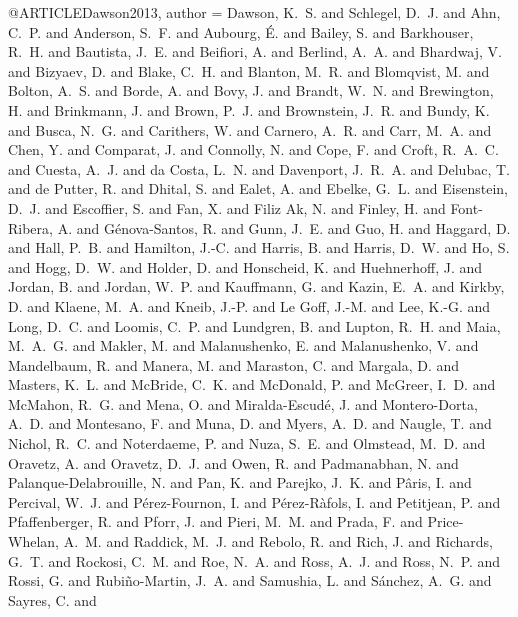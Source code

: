 \documentclass{aa}
\begin{document}
{{{{{{{{{{{{@ARTICLE{Dawson2013,
   author = {{Dawson}, K.~S. and {Schlegel}, D.~J. and {Ahn}, C.~P. and {Anderson}, S.~F. and 
	{Aubourg}, {\'E}. and {Bailey}, S. and {Barkhouser}, R.~H. and 
	{Bautista}, J.~E. and {Beifiori}, A. and {Berlind}, A.~A. and 
	{Bhardwaj}, V. and {Bizyaev}, D. and {Blake}, C.~H. and {Blanton}, M.~R. and 
	{Blomqvist}, M. and {Bolton}, A.~S. and {Borde}, A. and {Bovy}, J. and 
	{Brandt}, W.~N. and {Brewington}, H. and {Brinkmann}, J. and 
	{Brown}, P.~J. and {Brownstein}, J.~R. and {Bundy}, K. and {Busca}, N.~G. and 
	{Carithers}, W. and {Carnero}, A.~R. and {Carr}, M.~A. and {Chen}, Y. and 
	{Comparat}, J. and {Connolly}, N. and {Cope}, F. and {Croft}, R.~A.~C. and 
	{Cuesta}, A.~J. and {da Costa}, L.~N. and {Davenport}, J.~R.~A. and 
	{Delubac}, T. and {de Putter}, R. and {Dhital}, S. and {Ealet}, A. and 
	{Ebelke}, G.~L. and {Eisenstein}, D.~J. and {Escoffier}, S. and 
	{Fan}, X. and {Filiz Ak}, N. and {Finley}, H. and {Font-Ribera}, A. and 
	{G{\'e}nova-Santos}, R. and {Gunn}, J.~E. and {Guo}, H. and 
	{Haggard}, D. and {Hall}, P.~B. and {Hamilton}, J.-C. and {Harris}, B. and 
	{Harris}, D.~W. and {Ho}, S. and {Hogg}, D.~W. and {Holder}, D. and 
	{Honscheid}, K. and {Huehnerhoff}, J. and {Jordan}, B. and {Jordan}, W.~P. and 
	{Kauffmann}, G. and {Kazin}, E.~A. and {Kirkby}, D. and {Klaene}, M.~A. and 
	{Kneib}, J.-P. and {Le Goff}, J.-M. and {Lee}, K.-G. and {Long}, D.~C. and 
	{Loomis}, C.~P. and {Lundgren}, B. and {Lupton}, R.~H. and {Maia}, M.~A.~G. and 
	{Makler}, M. and {Malanushenko}, E. and {Malanushenko}, V. and 
	{Mandelbaum}, R. and {Manera}, M. and {Maraston}, C. and {Margala}, D. and 
	{Masters}, K.~L. and {McBride}, C.~K. and {McDonald}, P. and 
	{McGreer}, I.~D. and {McMahon}, R.~G. and {Mena}, O. and {Miralda-Escud{\'e}}, J. and 
	{Montero-Dorta}, A.~D. and {Montesano}, F. and {Muna}, D. and 
	{Myers}, A.~D. and {Naugle}, T. and {Nichol}, R.~C. and {Noterdaeme}, P. and 
	{Nuza}, S.~E. and {Olmstead}, M.~D. and {Oravetz}, A. and {Oravetz}, D.~J. and 
	{Owen}, R. and {Padmanabhan}, N. and {Palanque-Delabrouille}, N. and 
	{Pan}, K. and {Parejko}, J.~K. and {P{\^a}ris}, I. and {Percival}, W.~J. and 
	{P{\'e}rez-Fournon}, I. and {P{\'e}rez-R{\`a}fols}, I. and {Petitjean}, P. and 
	{Pfaffenberger}, R. and {Pforr}, J. and {Pieri}, M.~M. and {Prada}, F. and 
	{Price-Whelan}, A.~M. and {Raddick}, M.~J. and {Rebolo}, R. and 
	{Rich}, J. and {Richards}, G.~T. and {Rockosi}, C.~M. and {Roe}, N.~A. and 
	{Ross}, A.~J. and {Ross}, N.~P. and {Rossi}, G. and {Rubi{\~n}o-Martin}, J.~A. and 
	{Samushia}, L. and {S{\'a}nchez}, A.~G. and {Sayres}, C. and 
}}}}}}}}}}}}}}
\end{document}
